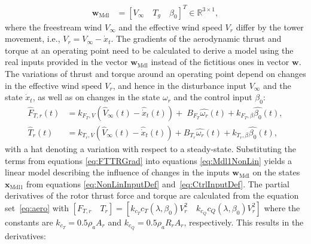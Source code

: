 \begin{align} \label{eq:CtrlInputDef}
    \bm{w}_{\text{Mdl}} &= [ V_{\infty} \quad T_{g} \quad \beta_{0}]^T \in \mathbb{R}^{3 \times 1},
\end{align}
where the freestream wind $V_{\infty}$ and the effective wind speed $V_r$ differ by the tower movement, i.e., $V_r = V_{\infty} - \dot{x}_t$.
The gradients of the aerodynamic thrust and torque at an operating point need to be calculated to derive a model using the real inputs provided in the vector $\bm{w}_{\text{Mdl}}$ instead of the fictitious ones in vector $\bm{w}$. The variations of thrust and torque around an operating point depend on changes in the effective wind speed $V_r$, and hence in the disturbance input $V_{\infty}$ and the state $\dot{x}_t$, as well as on changes in the state $\omega_r$ and the control input $\beta_{0}$:
\begin{equation} \label{eq:FTTRGrad}
    \begin{split}
        \hat{F}_{T,r}(t) &= k_{F_T,V} \left( \hat{V}_{\infty}(t) - \hat{\dot{x}}_{t}(t)\right) + \; B_{F_T} \hat{\omega_r}(t) +  k_{F_T,\beta} \hat{\beta_0}(t), \\
        \hat{T}_r(t) &= k_{T_r,V} \left( \hat{V}_{\infty}(t) - \hat{\dot{x}}_{t}(t)\right) + B_{T_r} \hat{\omega_r}(t) + k_{T_r,\beta} \hat{\beta_0}(t),
    \end{split}
\end{equation} \enlargethispage{\baselineskip}
with a hat denoting a variation with respect to a steady-state. Substituting the terms from equations \eqref{eq:FTTRGrad} into equations \eqref{eq:Mdl1NonLin} yields a linear model describing the influence of changes in the inputs $\bm{w}_{\text{Mdl}}$ on the states $\bm{x}_{\text{Mdl1}}$ from equations \eqref{eq:NonLinInputDef} and~\eqref{eq:CtrlInputDef}. The partial derivatives of the rotor thrust force and torque are calculated from the equation set~\eqref{eq:aero} with $[F_{T,r} \quad T_r] = [k_{c_T} c_T(\lambda,\beta_0) V_r^2 \quad k_{c_Q}  c_Q(\lambda,\beta_0) V_r^2]$ where the constants are $k_{c_T} = 0.5 \rho_a A_r$ and $k_{c_Q} = 0.5 \rho_a R_r A_r$, respectively. This results in the derivatives: 
